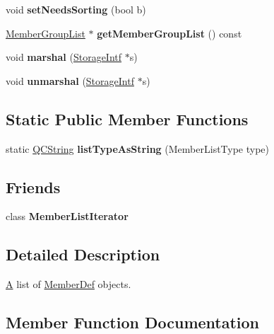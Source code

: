 \begin{DoxyCompactItemize}
void {\bfseries set\+Needs\+Sorting} (bool b)
\item 
\mbox{\label{class_member_list_aef1439fede9981147075f7a6e4c0c00e}} 
\mbox{\hyperlink{class_member_group_list}{Member\+Group\+List}} $\ast$ {\bfseries get\+Member\+Group\+List} () const
\item 
\mbox{\label{class_member_list_a8245bc832c29dd08df70ede578aacd03}} 
void {\bfseries marshal} (\mbox{\hyperlink{class_storage_intf}{Storage\+Intf}} $\ast$s)
\item 
\mbox{\label{class_member_list_a219e755f3e4eba6623cff7cdb9360653}} 
void {\bfseries unmarshal} (\mbox{\hyperlink{class_storage_intf}{Storage\+Intf}} $\ast$s)
\end{DoxyCompactItemize}
\subsection*{Static Public Member Functions}
\begin{DoxyCompactItemize}
\item 
\mbox{\label{class_member_list_ac0fbfaf649f81b17c268d1cd56c41da6}} 
static \mbox{\hyperlink{class_q_c_string}{Q\+C\+String}} {\bfseries list\+Type\+As\+String} (Member\+List\+Type type)
\end{DoxyCompactItemize}
\subsection*{Friends}
\begin{DoxyCompactItemize}
\item 
\mbox{\label{class_member_list_a6cbe3303089547fba91ac1c5208ecfd5}} 
class {\bfseries Member\+List\+Iterator}
\end{DoxyCompactItemize}


\subsection{Detailed Description}
\mbox{\hyperlink{class_a}{A}} list of \mbox{\hyperlink{class_member_def}{Member\+Def}} objects. 

\subsection{Member Function Documentation}
\mbox{\label{class_member_list_a38422e3b6e288256a4e3375c90a0a4a4}} 
